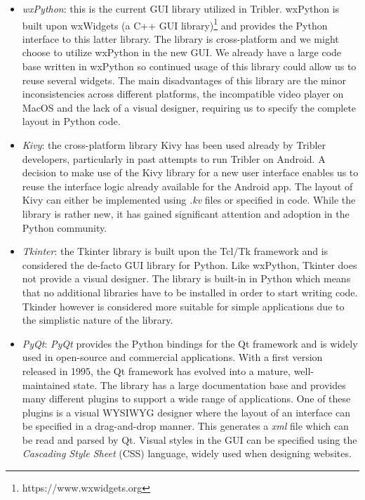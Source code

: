 \begin{itemize}
	\item \emph{wxPython}\cite{rappin2006wxpython}: this is the current GUI library utilized in Tribler. wxPython is built upon wxWidgets (a C++ GUI library)\footnote{https://www.wxwidgets.org} and provides the Python interface to this latter library. The library is cross-platform and we might choose to utilize wxPython in the new GUI. We already have a large code base written in wxPython so continued usage of this library could allow us to reuse several widgets. The main disadvantages of this library are the minor inconsistencies across different platforms, the incompatible video player on MacOS and the lack of a visual designer, requiring us to specify the complete layout in Python code.
	\item \emph{Kivy}\cite{solis2015kivy}: the cross-platform library Kivy has been used already by Tribler developers, particularly in past attempts to run Tribler on Android\cite{de2014android}\cite{sabee2014tribler}. A decision to make use of the Kivy library for a new user interface enables us to reuse the interface logic already available for the Android app. The layout of Kivy can either be implemented using \emph{.kv} files or specified in code. While the library is rather new, it has gained significant attention and adoption in the Python community.
	\item \emph{Tkinter}\cite{lundh1999introduction}: the Tkinter library is built upon the Tcl/Tk framework and is considered the de-facto GUI library for Python. Like wxPython, Tkinter does not provide a visual designer. The library is built-in in Python which means that no additional libraries have to be installed in order to start writing code. Tkinder however is considered more suitable for simple applications due to the simplistic nature of the library.
	\item \emph{PyQt}\cite{summerfield2007rapid}: \emph{PyQt} provides the Python bindings for the Qt framework and is widely used in open-source and commercial applications. With a first version released in 1995, the Qt framework has evolved into a mature, well-maintained state. The library has a large documentation base and provides many different plugins to support a wide range of applications. One of these plugins is a visual WYSIWYG designer where the layout of an interface can be specified in a drag-and-drop manner. This generates a \emph{xml} file which can be read and parsed by Qt. Visual styles in the GUI can be specified using the \emph{Cascading Style Sheet} (CSS) language, widely used when designing websites.
\end{itemize}
